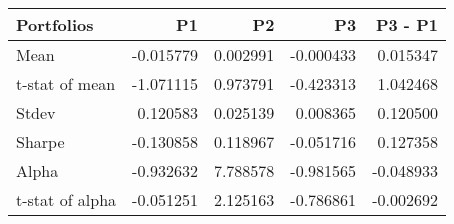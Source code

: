 \begin{tabular}{lrrrr}
\toprule
Portfolios & P1 & P2 & P3 & P3 - P1 \\
\midrule
Mean & -0.015779 & 0.002991 & -0.000433 & 0.015347 \\
t-stat of mean & -1.071115 & 0.973791 & -0.423313 & 1.042468 \\
Stdev & 0.120583 & 0.025139 & 0.008365 & 0.120500 \\
Sharpe & -0.130858 & 0.118967 & -0.051716 & 0.127358 \\
Alpha & -0.932632 & 7.788578 & -0.981565 & -0.048933 \\
t-stat of alpha & -0.051251 & 2.125163 & -0.786861 & -0.002692 \\
\bottomrule
\end{tabular}
